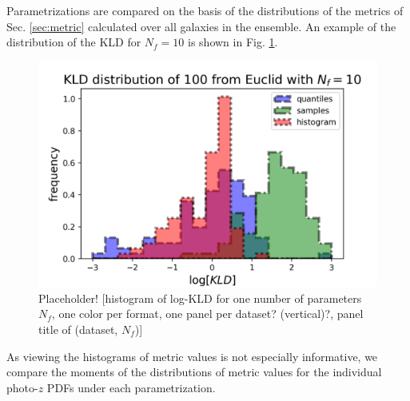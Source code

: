 \documentclass[\docopts]{\docclass}
\newcommand{\pz}{photo-$z$ PDF}
\begin{document}
Parametrizations are compared on the basis of the distributions of the metrics 
of Sec. \ref{sec:metric} calculated over all galaxies in the ensemble.  An 
example of the distribution of the KLD for $N_{f}=10$ is shown in Fig. 
\ref{fig:individual}.

\begin{figure}
  \includegraphics[width=0.9\columnwidth]{figures/individual_placeholder.png}
  \caption{Placeholder! [histogram of log-KLD for one number of parameters 
$N_{f}$, one color per format, one panel per dataset? (vertical)?, panel title 
of (dataset, $N_{f}$)]
  \label{fig:individual}}
\end{figure}

As viewing the histograms of metric values is not especially informative, we 
compare the moments of the distributions of metric values for the individual 
\pz s under each parametrization.
\end{document}

